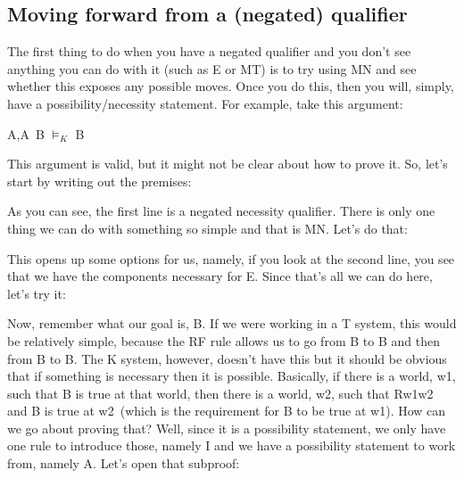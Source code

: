 \subsection{Moving forward from a (negated) qualifier}

The first thing to do when you have a negated qualifier and you don't see anything you can do with it (such as \eor E or MT) is to try using MN and see whether this exposes any possible moves. Once you do this, then you will, simply, have a possibility/necessity statement. For example, take this argument:
\begin{center}
\enot \ebox A,\ediamond \enot A\eif  \ebox B $\vDash_K$ \ediamond B
\end{center}
This argument is valid, but it might not be clear about how to prove it. So, let's start by writing out the premises:
\begin{fitchproof}
\end{fitchproof}
As you can see, the first line is a negated necessity qualifier. There is only one thing we can do with something so simple and that is MN. Let's do that:
\begin{fitchproof}
\end{fitchproof}
This opens up some options for us, namely, if you look at the second line, you see that we have the components necessary for \eif E. Since that's all we can do here, let's try it:
\begin{fitchproof}
\end{fitchproof}
Now, remember what our goal is, \ediamond B. If we were working in a T system, this would be relatively simple, because the RF rule allows us to go from \ebox B to B and then from B to \ediamond B. The K system, however, doesn't have this but it should be obvious that if something is necessary then it is possible. Basically, if there is a world, w1, such that \ebox B is true at that world, then there is a world, w2, such that Rw1w2  and B is true at w2 (which is the requirement for \ediamond B to be true at w1). How can we go about proving that? Well, since it is a possibility statement, we only have one rule to introduce those, namely \ediamond I and we have a possibility statement to work from, namely \ediamond \enot A. Let's open that subproof:
\begin{fitchproof}
\open
{} 
\end{fitchproof}

